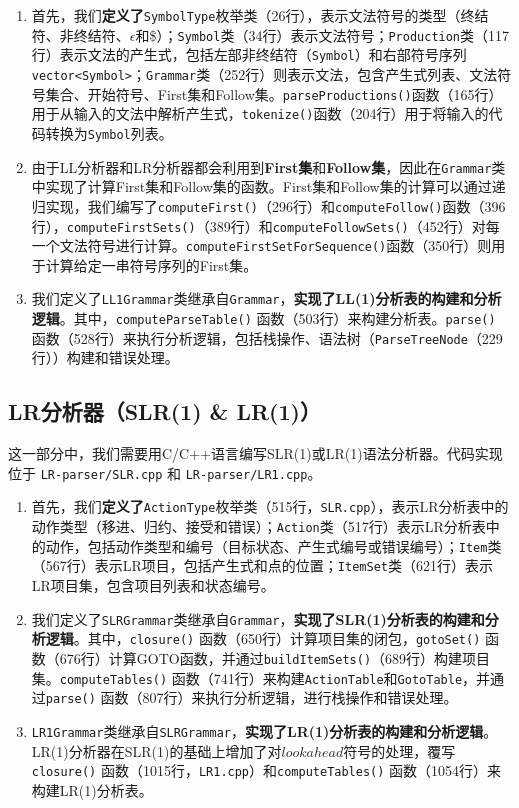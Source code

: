 \documentclass[UTF8,openany]{ctexbook}
\begin{document}
\begin{enumerate}[noitemsep,topsep=0pt,partopsep=0pt]
    \item 首先，我们\textbf{定义了}\texttt{SymbolType}枚举类（26行），表示文法符号的类型（终结符、非终结符、$\epsilon$和\$）；\texttt{Symbol}类（34行）表示文法符号；\texttt{Production}类（117行）表示文法的产生式，包括左部非终结符（\texttt{Symbol}）和右部符号序列\texttt{vector<Symbol>}；\texttt{Grammar}类（252行）则表示文法，包含产生式列表、文法符号集合、开始符号、First集和Follow集。\texttt{parseProductions()}函数（165行）用于从输入的文法中解析产生式，\texttt{tokenize()}函数（204行）用于将输入的代码转换为\texttt{Symbol}列表。
    \item 由于LL分析器和LR分析器都会利用到\textbf{First集}和\textbf{Follow集}，因此在\texttt{Grammar}类中实现了计算First集和Follow集的函数。First集和Follow集的计算可以通过递归实现，我们编写了\texttt{computeFirst()}（296行）和\texttt{computeFollow()}函数（396行），\texttt{computeFirstSets()}（389行）和\texttt{computeFollowSets()}（452行）对每一个文法符号进行计算。\texttt{computeFirstSetForSequence()}函数（350行）则用于计算给定一串符号序列的First集。
    \item 我们定义了\texttt{LL1Grammar}类继承自\texttt{Grammar}，\textbf{实现了LL(1)分析表的构建和分析逻辑}。其中，\texttt{computeParseTable()} 函数（503行）来构建分析表。\texttt{parse()} 函数（528行）来执行分析逻辑，包括栈操作、语法树（\texttt{ParseTreeNode}（229行））构建和错误处理。%
\end{enumerate}

\subsection{LR分析器（SLR(1) \& LR(1)）}

这一部分中，我们需要用C/C++语言编写SLR(1)或LR(1)语法分析器。代码实现位于 \texttt{LR-parser/SLR.cpp} 和 \texttt{LR-parser/LR1.cpp}。

\begin{enumerate}[noitemsep,topsep=0pt,partopsep=0pt]
    \item 首先，我们\textbf{定义了}\texttt{ActionType}枚举类（515行，\texttt{SLR.cpp}），表示LR分析表中的动作类型（移进、归约、接受和错误）；\texttt{Action}类（517行）表示LR分析表中的动作，包括动作类型和编号（目标状态、产生式编号或错误编号）；\texttt{Item}类（567行）表示LR项目，包括产生式和点的位置；\texttt{ItemSet}类（621行）表示LR项目集，包含项目列表和状态编号。
    \item 我们定义了\texttt{SLRGrammar}类继承自\texttt{Grammar}，\textbf{实现了SLR(1)分析表的构建和分析逻辑}。其中，\texttt{closure()} 函数（650行）计算项目集的闭包，\texttt{gotoSet()} 函数（676行）计算GOTO函数，并通过\texttt{buildItemSets()}（689行）构建项目集。\texttt{computeTables()} 函数（741行）来构建\texttt{ActionTable}和\texttt{GotoTable}，并通过\texttt{parse()} 函数（807行）来执行分析逻辑，进行栈操作和错误处理。%
    \item \texttt{LR1Grammar}类继承自\texttt{SLRGrammar}，\textbf{实现了LR(1)分析表的构建和分析逻辑}。LR(1)分析器在SLR(1)的基础上增加了对$lookahead$符号的处理，覆写\texttt{closure()} 函数（1015行，\texttt{LR1.cpp}）和\texttt{computeTables()} 函数（1054行）来构建LR(1)分析表。
\end{enumerate}
\end{document}
